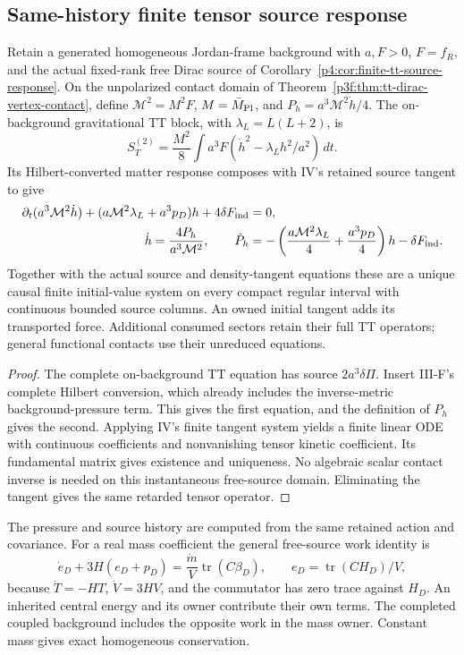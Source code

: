 \documentclass[12pt,a4paper]{article}
\begin{document}
\subsection{Same-history finite tensor source response}
\label{p8:sec:same-history-tensor-source}
\begin{corollary}
\label{p8:cor:causal-tt-dirac-system}
Retain a generated homogeneous Jordan-frame background with $a,F>0$,
$F=f_R$, and the actual fixed-rank free Dirac source of
Corollary~\ref{p4:cor:finite-tt-source-response}. On the unpolarized contact
domain of Theorem~\ref{p3f:thm:tt-dirac-vertex-contact}, define
$\mathcal M^2=M^2F$, $M=\bar M_{\rm Pl}$,
and $P_h=a^3\mathcal M^2\dot h/4$. The on-background gravitational TT
block, with $\lambda_L=L(L+2)$, is
\[
 S_T^{(2)}=\frac{M^2}{8}\int a^3F
                      (\dot h^2-\lambda_Lh^2/a^2)\,dt.
\]
Its Hilbert-converted matter response composes with IV's retained source
tangent to give
\begin{align*}
 \partial_t(a^3\mathcal M^2\dot h)
      +(a\mathcal M^2\lambda_L+a^3p_D)h
      +4\delta F_{\rm ind}&=0,\\
 \dot h=\frac{4P_h}{a^3\mathcal M^2},\qquad
 \dot P_h&=-\left(\frac{a\mathcal M^2\lambda_L}{4}
                     +\frac{a^3p_D}{4}\right)h-\delta F_{\rm ind}.
\end{align*}
Together with the actual source and density-tangent equations these are
a unique causal finite initial-value system on every compact regular
interval with continuous bounded source columns. An owned initial tangent
adds its transported force. Additional consumed sectors retain their full
TT operators; general functional contacts use their unreduced equations.
\end{corollary}
\begin{proof}
The complete on-background TT equation has source $2a^3\delta\Pi$.
Insert III-F's complete Hilbert conversion, which already includes the
inverse-metric background-pressure term. This gives the first equation,
and the definition of $P_h$ gives the second. Applying IV's finite tangent
system yields a finite linear ODE with continuous coefficients and
nonvanishing tensor kinetic coefficient. Its fundamental matrix gives
existence and uniqueness. No algebraic scalar contact inverse is needed
on this instantaneous free-source domain. Eliminating the tangent gives
the same retarded tensor operator.
\end{proof}
The pressure and source history are computed from the same retained action
and covariance. For a real mass coefficient the general free-source work
identity is
\[
 \dot e_D+3H(e_D+p_D)
      =\frac{\dot m}{V}\operatorname{tr}(C\beta_D),\qquad
 e_D=\operatorname{tr}(CH_D)/V,
\]
because $\dot T=-HT$, $\dot V=3HV$, and the commutator has zero trace
against $H_D$. An inherited central energy and its owner contribute their
own terms. The completed coupled background includes the opposite work
in the mass owner. Constant mass gives exact homogeneous conservation.
\end{document}
